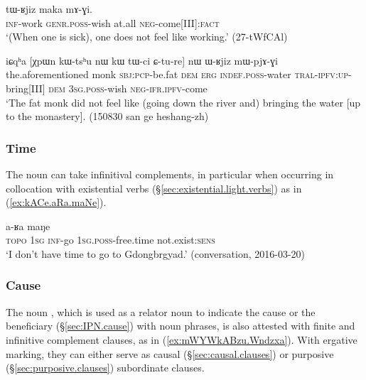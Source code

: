 \begin{exe}
\ex  \label{ex:kAnAma.tWRjiz}
\gll [kɤ-nɤma] tɯ-ʁjiz maka mɤ-ɣi. \\
\textsc{inf}-work \textsc{genr}.\textsc{poss}-wish at.all \textsc{neg}-come[III]:\textsc{fact} \\
\glt `(When one is sick), one does not feel like working.' (27-tWfCAl)
\end{exe}

\begin{exe}
\ex  \label{ex:Cture.WRjiz}
\gll  iɕqʰa [χpɯn kɯ-tsʰu nɯ kɯ tɯ-ci ɕ-tu-re] nɯ ɯ-ʁjiz mɯ-pjɤ-ɣi  \\
the.aforementioned monk \textsc{sbj}:\textsc{pcp}-be.fat \textsc{dem} \textsc{erg} \textsc{indef}.\textsc{poss}-water \textsc{tral}-\textsc{ipfv}:\textsc{up}-bring[III] \textsc{dem} \textsc{3sg}.\textsc{poss}-wish \textsc{neg}-\textsc{ifr}.\textsc{ipfv}-come  \\
\glt `The fat monk did not feel like (going down the river and) bringing the water [up to the monastery]. (150830 san ge heshang-zh)
\end{exe} 
 
 
\subsubsection{Time} \label{sec:free.time.complement}
The noun  can take infinitival complements, in particular when occurring in collocation with existential verbs (§\ref{sec:existential.light.verbs}) as in (\ref{ex:kACe.aRa.maNe}). 
 
\begin{exe}
\ex  \label{ex:kACe.aRa.maNe}
 a-ʁa maŋe \\
\textsc{topo} \textsc{1sg} \textsc{inf}-go \textsc{1sg}.\textsc{poss}-free.time not.exist:\textsc{sens} \\
\glt `I don't have time to go to Gdongbrgyad.' (conversation, 2016-03-20)
\end{exe} 

 
\subsubsection{Cause} \label{sec:nouns.cause.complement}
The noun , which is used as a relator noun to indicate the cause or the beneficiary (§\ref{sec:IPN.cause}) with noun phrases, is also attested with finite and infinitive complement clauses, as in (\ref{ex:mWYWkABzu.Wndzxa}). With ergative marking, they can either serve as causal (§\ref{sec:causal.clauses}) or purposive (§\ref{sec:purposive.clauses}) subordinate clauses.


